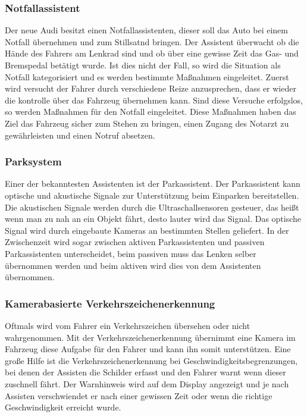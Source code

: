         \subsubsection{Notfallassistent}
        Der neue Audi besitzt einen Notfallassistenten, dieser soll das Auto bei einem Notfall übernehmen 
        und zum Stillsatnd bringen. Der Assistent überwacht ob die Hände des Fahrers am Lenkrad sind und 
        ob über eine gewisse Zeit das Gas- und Bremspedal betätigt wurde. Ist dies nicht der Fall, so 
        wird die Situation als Notfall kategorisiert und es werden bestimmte Maßnahmen eingeleitet.
        Zuerst wird versucht der Fahrer durch verschiedene Reize anzusprechen, dass er wieder die kontrolle 
        über das Fahrzeug übernehmen kann. Sind diese Versuche erfolgslos, so werden Maßnahmen für den 
        Notfall eingeleitet. Diese Maßnahmen haben das Ziel das Fahrzeug sicher zum Stehen zu bringen, einen Zugang des 
        Notarzt zu gewährleisten und einen Notruf absetzen.
        ~\cite{Audi.PB1}
        
        \subsubsection{Parksystem}
        Einer der bekanntesten Assistenten ist der Parkassistent. Der Parkassistent kann optische und 
        akustische Signale zur Unterstützung beim Einparken bereitstellen. Die akustischen Signale werden
        durch die Ultraschallsensoren gesteuer, das heißt wenn man zu nah an ein Objekt fährt, desto lauter 
        wird das Signal. Das optische Signal wird durch eingebaute Kameras an bestimmten Stellen geliefert.
        In der Zwischenzeit wird sogar zwischen aktiven Parkassistenten und passiven Parkassistenten 
        unterscheidet, beim passiven muss das Lenken selber übernommen werden und beim aktiven wird 
        dies von dem Assistenten übernommen.
        ~\cite{parkassi.PB1} ~\cite{assistenzsysteme.PB1} ~\cite{parkassi.PB2}
        
        \subsubsection{Kamerabasierte Verkehrszeichenerkennung}
        Oftmals wird vom Fahrer ein Verkehrszeichen übersehen oder nicht wahrgenommen. Mit der Verkehrszeichenerkennung 
        übernimmt eine Kamera im Fahrzeug diese Aufgabe für den Fahrer und kann ihn somit unterstützen.
        Eine große Hilfe ist die Verkehrszeichenerkennung bei Geschwindigkeitsbegrenzungen, bei denen der 
        Assisten die Schilder erfasst und den Fahrer warnt wenn dieser zuschnell fährt. Der Warnhinweis 
        wird auf dem Display angezeigt und je nach Assisten verschwiendet er nach einer gewissen Zeit oder 
        wenn die richtige Geschwindigkeit erreicht wurde.
        ~\cite{assistenzsysteme.PB1} ~\cite{verkehrszeichenerk.PB1} ~\cite{verkehrszeichenerk.PB2}
        
